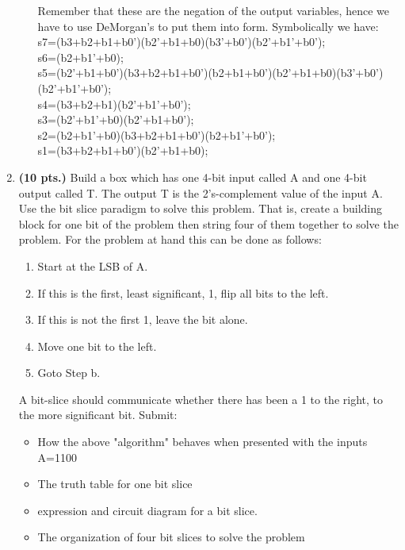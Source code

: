 \begin{enumerate}
\begin{enumerate}
\begin{solution}
{%

Remember that these are the negation of the output variables, hence
we have to use DeMorgan's to put them into \POSmin form.  
Symbolically we have:
s7=(b3+b2+b1+b0')(b2'+b1+b0)(b3'+b0')(b2'+b1'+b0'); \\
s6=(b2+b1'+b0); \\
s5=(b2'+b1+b0')(b3+b2+b1+b0')(b2+b1+b0')(b2'+b1+b0)(b3'+b0')(b2'+b1'+b0'); \\
s4=(b3+b2+b1)(b2'+b1'+b0'); \\
s3=(b2'+b1'+b0)(b2'+b1+b0'); \\
s2=(b2+b1'+b0)(b3+b2+b1+b0')(b2+b1'+b0'); \\
s1=(b3+b2+b1+b0')(b2'+b1+b0); \\
}\end{solution}
\end{enumerate}

\item {\bf (10 pts.)} Build a box which has one 4-bit input called A and  
one 4-bit output called T. The output T is the 2's-complement value
of the input A.  Use the bit slice paradigm to solve this
problem.  That is, create a building block for one bit of the problem 
then string four of them together to solve the problem.
For the problem at hand this can be done as follows:
\begin{enumerate}
	\item Start at the LSB of A.
        \item If this is the first, least significant, 1, flip all bits 
		to the left.
        \item If this is not the first 1, leave the bit alone.
        \item Move one bit to the left.
        \item Goto Step b.
\end{enumerate}
A bit-slice should communicate whether there has been a 1 to the right,
to the more significant bit.  Submit:
\begin{itemize}
	\item How the above "algorithm" behaves when presented with
        the inputs A=1100
        \item The truth table for one bit slice
        \item \SOPmin expression and circuit diagram for a bit slice.
        \item The organization of four bit slices to solve the problem
\end{itemize}


\end{enumerate}
